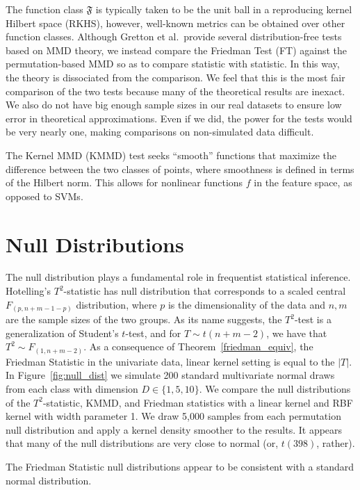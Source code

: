 The function class $\mathfrak{F}$ is typically taken to be the unit ball in a
reproducing kernel Hilbert space (RKHS), however, well-known metrics
can be obtained over other function classes.  Although Gretton et
al.\ provide several distribution-free tests based on MMD theory, we
instead compare the Friedman Test (FT) against the permutation-based
MMD so as to compare statistic with statistic.  In this way, the
theory is dissociated from the comparison.  We feel that this is the
most fair comparison of the two tests because many of the theoretical
results are inexact.  We also do not have big enough sample sizes in
our real datasets to ensure low error in theoretical approximations.
Even if we did, the power for the tests would be very nearly one,
making comparisons on non-simulated data difficult.

The Kernel MMD (KMMD) test seeks ``smooth'' functions that maximize
the difference between the two classes of points, where smoothness
is defined in terms of the Hilbert norm.  This allows for nonlinear
functions $f$ in the feature space, as opposed to SVMs.

\section{Null Distributions}
The null distribution plays a fundamental role in frequentist statistical
inference.  Hotelling's $T^2$-statistic has null distribution that
corresponds to a scaled central $F_{(p, n+m-1-p)}$ distribution, where
$p$ is the dimensionality of the data and $n, m$ are the sample sizes
of the two groups.  As its name suggests, the $T^2$-test is a
generalization of Student's $t$-test, and for $T \sim t(n+m-2)$, we
have that $T^2 \sim F_{(1, n+m-2)}$.  As a consequence of
Theorem~\ref{friedman_equiv}, the Friedman Statistic in the univariate
data, linear kernel setting is equal to the $|T|$.  In Figure~\ref{fig:null_dist} we simulate
200 standard multivariate normal draws from each class with dimension
$D \in \{1, 5, 10\}$.  We compare the null distributions of the
$T^2$-statistic, KMMD, and Friedman statistics with a linear kernel
and RBF kernel with width parameter 1.  We draw 5,000 samples from
each permutation null distribution and apply a kernel density smoother
to the results.  It appears that many of the null distributions are
very close to normal (or, $t(398)$, rather).

The Friedman Statistic null distributions appear to be consistent with
a standard normal distribution.

